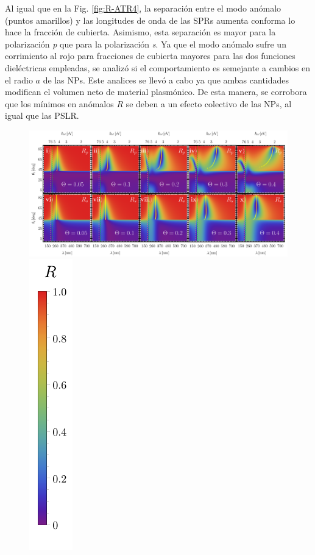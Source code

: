 \documentclass[letterpaper,11pt] {article}
\begin{document}
Al igual que en la Fig.  \ref{fig:R-ATR4}, la separación  entre el modo anómalo (puntos amarillos) y las longitudes de onda de las SPRs aumenta conforma lo hace la fracción de cubierta.  Asimismo, esta separación es mayor para la polarización \emph{p} que para la polarización \emph{s}.  Ya que el modo anómalo sufre un corrimiento al rojo para fracciones de cubierta mayores para las dos funciones dieléctricas empleadas,  se analizó si el comportamiento es semejante a cambios en el radio $a$ de las NPs.  Este analices se llevó a cabo ya que ambas cantidades modifican el volumen neto de material plasmónico.  De esta manera, se corrobora que los mínimos en anómalos $R$ se deben a un efecto colectivo de las NPs, al igual que las PSLR. 


	\begin{figure}[t!]\centering
\includegraphics[width = .9\linewidth]{2-Wp10ThetaVar/0-2D_Grid}%
\includegraphics[scale=.85, trim={00 -5 00 00}, clip]{0-RBar_v}

\end{figure}
\end{document}
